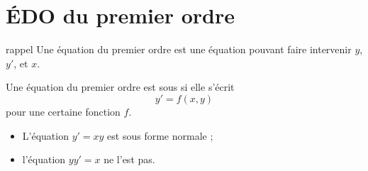 \section{ÉDO du premier ordre}
\begin{frame}
  \begin{block}{rappel}
    Une équation du premier ordre est une équation pouvant faire intervenir \(y\), \(y'\), et \(x\).
  \end{block}\pause{}

  \begin{definition}
    Une équation du premier ordre est sous  si elle s'écrit\pause{}
    \begin{equation*}
      y' = f(x,y)
    \end{equation*}
    pour une certaine fonction \(f\).
  \end{definition}\pause{}

  \begin{example}
    \begin{itemize}
    \item L'équation \(y' = xy\) est sous forme normale ;\pause{}
    \item l'équation \(y y' = x\) ne l'est pas.\pause{}
    \end{itemize}
  \end{example}
\end{frame}

